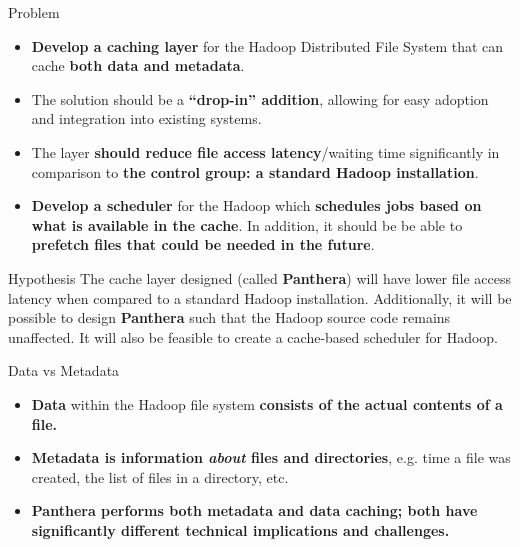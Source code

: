 \documentclass[final]{beamer} %
\begin{document}
\begin{frame}
\begin{columns}[t]
\begin{column}{0.32\textwidth}
    \begin{block}{Problem}
	\begin{itemize}
	 \item \textbf{Develop a caching layer} for the Hadoop Distributed File System that can cache \textbf{both data and metadata}.
	 \item The solution should be a \textbf{``drop-in'' addition}, allowing for easy adoption and integration into existing systems.
	 \item The layer \textbf{should reduce file access latency}/waiting time significantly in comparison to \textbf{the control group: a standard Hadoop installation}.
	 \item \textbf{Develop a scheduler} for the Hadoop which \textbf{schedules jobs based on what is available in the cache}. In addition, it should be be able to \textbf{prefetch files that could be needed in the future}.
	\end{itemize}

      \end{block}

      \begin{block}{Hypothesis}
       The cache layer designed (called \textbf{Panthera}) will have lower file
       access latency when compared to a standard Hadoop installation. Additionally, it
       will be possible to design \textbf{Panthera} such that the Hadoop source code
       remains unaffected. It will also be feasible to create a cache-based 
       scheduler for Hadoop.
      \end{block}
	  
		\begin{block}{Data vs Metadata}
			\begin{itemize}
				\item \textbf{Data} within the Hadoop file system \textbf{consists of the actual contents of a file.}
				\item \textbf{Metadata is information \textit{about} files and directories}, e.g. time a file was created, the list of files in a directory, etc.
				\item \textbf{Panthera performs both metadata
			and data caching; both have significantly different technical implications
			and challenges.}
			\end{itemize}
		\end{block}
	

\end{column}
\end{columns}
\end{frame}
\end{document}
